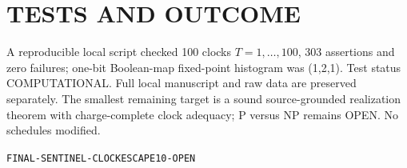 \documentclass{article}
\begin{document}
\section{TESTS AND OUTCOME}
A reproducible local script checked 100 clocks $T=1,\ldots,100$, 303 assertions and zero failures; one-bit Boolean-map fixed-point histogram was (1,2,1). Test status COMPUTATIONAL. Full local manuscript and raw data are preserved separately. The smallest remaining target is a sound source-grounded realization theorem with charge-complete clock adequacy; P versus NP remains OPEN. No schedules modified.
\par\noindent\texttt{FINAL-SENTINEL-CLOCKESCAPE10-OPEN}
\end{document}
